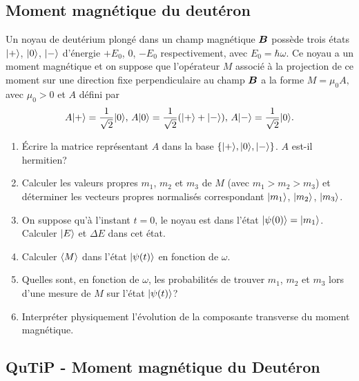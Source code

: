 \subsection{Moment magnétique du deutéron}

Un noyau de deutérium plongé dans un champ magnétique $\boldsymbol{B}$ possède
trois états $\vert+\rangle$, $\vert0\rangle $, $\vert-\rangle$ d'énergie $+E_0$, $0$, $-E_0$
respectivement, avec $E_0=\hbar\omega$. Ce noyau a un moment magnétique et on
suppose que l'opérateur $M$ associé à la projection de ce moment sur une
direction fixe perpendiculaire au champ $\boldsymbol{B}$ a la forme
$M=\mu_0A,$ avec $\mu_0>0$ et $A$ défini par%
\begin{equation}
A\vert+\rangle=\frac{1}{\sqrt{2}}\vert0\rangle,\,A\vert0\rangle=\frac{1}{\sqrt{2}}(\vert+\rangle+\vert-\rangle
),\,A\vert-\rangle =\frac{1}{\sqrt{2}}\vert0\rangle .
\end{equation}

\begin{enumerate}
\item Écrire la matrice représentant $A$ dans la base $\{\vert+\rangle,\vert0\rangle,\vert-\rangle
\}$. $A$ est-il hermitien?

\item Calculer les valeurs propres $m_1$, $m_2$ et $m_3$ de $M$ (avec
$m_1>m_2>m_3$) et déterminer les vecteurs propres normalisés correspondant 
$\vert m_1\rangle$, $\vert m_2\rangle$, $\vert m_3\rangle$.

\item On suppose qu'à l'instant $t=0$, le noyau est dans l'état
$\vert\psi(0)\rangle=\vert m_1\rangle$. Calculer $\vert E\rangle$ et $\Delta E$ dans cet état.

\item Calculer $\langle{M}\rangle$ dans l'état $\vert\psi(t)\rangle$ en fonction de $\omega$.

\item Quelles sont, en fonction de $\omega$, les probabilités de trouver
$m_1$, $m_2$ et $m_3$ lors d'une mesure de $M$ sur l'état $\vert\psi(t)\rangle$?

\item Interpréter physiquement l'évolution de la composante transverse du
moment magnétique.
\end{enumerate}

\subsection{QuTiP - Moment magnétique du Deutéron}

